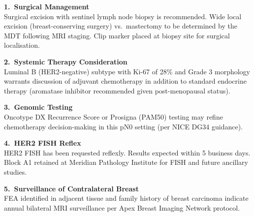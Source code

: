 \documentclass[11pt,a4paper]{article}
\begin{document}
\begin{tcolorbox}[sectionbox, title={\faImage\quad Schematic Representation of Microscopic Architecture}]
\begin{center}
\end{center}
\end{tcolorbox}

\vspace{4pt}

\begin{tcolorbox}[goldbox, title={\faClipboardList\quad Clinical Correlations \& Pathologist Recommendations}]
  \setlength{\parskip}{4pt}

  \textbf{\color{PathBlue}1.\ Surgical Management}\\
  Surgical excision with sentinel lymph node biopsy is recommended. Wide local excision
  (breast-conserving surgery) vs.\ mastectomy to be determined by the MDT following
  MRI staging. Clip marker placed at biopsy site for surgical localisation.

  \textbf{\color{PathBlue}2.\ Systemic Therapy Consideration}\\
  Luminal B (HER2-negative) subtype with Ki-67 of 28\%{} and Grade 3 morphology warrants
  discussion of adjuvant chemotherapy in addition to standard endocrine therapy
  (aromatase inhibitor recommended given post-menopausal status).

  \textbf{\color{PathBlue}3.\ Genomic Testing}\\
  Oncotype DX Recurrence Score or Prosigna (PAM50) testing may refine chemotherapy
  decision-making in this pN0 setting (per NICE DG34 guidance).

  \textbf{\color{PathBlue}4.\ HER2 FISH Reflex}\\
  HER2 FISH has been requested reflexly. Results expected within 5 business days.
  Block A1 retained at Meridian Pathology Institute for FISH and future ancillary studies.

  \textbf{\color{PathBlue}5.\ Surveillance of Contralateral Breast}\\
  FEA identified in adjacent tissue and family history of breast carcinoma indicate
  annual bilateral MRI surveillance per Apex Breast Imaging Network protocol.
\end{tcolorbox}
\end{document}
